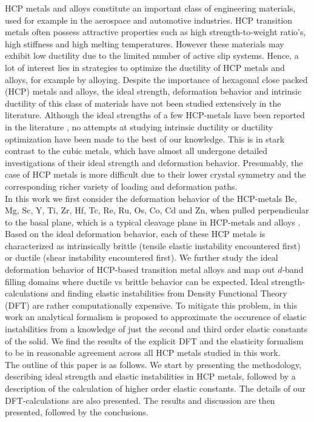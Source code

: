 \documentclass[showpacs,aps,floatfix,prb,reprint,superscriptaddress]{revtex4-1}
\begin{document}
HCP metals and alloys constitute an important class of engineering materials, used for example in the aerospace and automotive industries. HCP transition metals often possess attractive properties such as high strength-to-weight ratio's, high stiffness and high melting temperatures. However these materials may exhibit low ductility due to the limited number of active slip systems. Hence, a lot of interest lies in strategies to optimize the ductility of HCP metals and alloys, for example by alloying. Despite the importance of hexagonal close packed (HCP) metals and alloys, the ideal strength, deformation behavior and intrinsic ductility of this class of materials have not been studied extensively in the literature. Although the ideal strengths of a few HCP-metals have been reported in the literature \cite{fu2012first}, no attempts at studying intrinsic ductility or ductility optimization have been made to the best of our knowledge. This is in stark contrast to the cubic metals, which have almost all undergone detailed investigations of their ideal strength and deformation behavior. Presumably, the case of HCP metals is more difficult due to their lower crystal symmetry and the corresponding richer variety of loading and deformation paths. \\

In this work we first consider the deformation behavior of the HCP-metals Be, Mg, Sc, Y, Ti, Zr, Hf, Tc, Re, Ru, Os, Co, Cd and Zn, when pulled perpendicular to the basal plane, which is a typical cleavage plane in HCP-metals and alloys \cite{yoo1981slip}. Based on the ideal deformation behavior, each of these HCP metals is characterized as intrinsically brittle (tensile elastic instability encountered first) or ductile (shear instability encountered first). We further study the ideal deformation behavior of HCP-based transition metal alloys and map out $d$-band filling domains where ductile vs brittle behavior can be expected. Ideal strength-calculations and finding elastic instabilities from Density Functional Theory (DFT) are rather computationally expensive. To mitigate this problem, in this work an analytical formalism is proposed to approximate the occurence of elastic instabilities from a knowledge of just the second and third order elastic constants of the solid. We find the results of the explicit DFT and the elasticity formalism to be in reasonable agreement across all HCP metals studied in this work. \\

The outline of this paper is as follows. We start by presenting the methodology, describing ideal strength and elastic instabilities in HCP metals, followed by a description of the calculation of higher order elastic constants. The details of our DFT-calculations are also presented. The results and discussion are then presented, followed by the conclusions.
\end{document}
